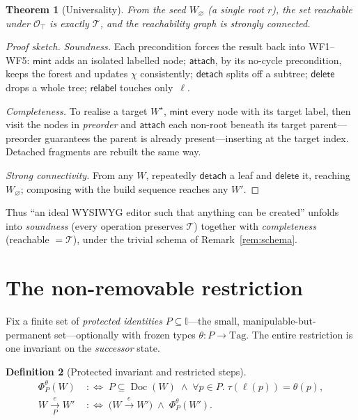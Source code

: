 \documentclass[11pt]{article}
\DeclareMathOperator{\Doc}{Doc}
\newcommand{\II}{\mathbb{I}}                 %
\newcommand{\Tree}{\mathcal{T}}              %
\newcommand{\Ops}{\mathcal{O}}
\newcommand{\coloniff}{\mathrel{:\Longleftrightarrow}}
\newcommand{\mint}{\mathsf{mint}}
\newcommand{\attach}{\mathsf{attach}}
\newcommand{\detach}{\mathsf{detach}}
\newcommand{\delete}{\mathsf{delete}}
\newcommand{\relabel}{\mathsf{relabel}}
\newcommand{\Wempty}{W_{\varnothing}}
\newcommand{\step}[1]{\xrightarrow{\,#1\,}}
\newcommand{\stepP}[1]{\xrightarrow[P]{\,#1\,}}
\theoremstyle{definition}
\newtheorem{definition}{Definition}[section]
\theoremstyle{plain}
\newtheorem{theorem}[definition]{Theorem}
\begin{document}
\begin{theorem}[Universality]\label{thm:univ}
From the seed $\Wempty$ (a single root $r$), the set reachable under
$\Ops_{\top}$ is exactly $\Tree$, and the reachability graph is strongly
connected.
\end{theorem}

\begin{proof}[Proof sketch]
\emph{Soundness.} Each precondition forces the result back into WF1--WF5: $\mint$
adds an isolated labelled node; $\attach$, by its no-cycle precondition, keeps
the forest and updates $\chi$ consistently; $\detach$ splits off a subtree;
$\delete$ drops a whole tree; $\relabel$ touches only~$\ell$.

\emph{Completeness.} To realise a target $W^\star$, $\mint$ every node with its
target label, then visit the nodes in \emph{preorder} and $\attach$ each
non-root beneath its target parent---preorder guarantees the parent is already
present---inserting at the target index. Detached fragments are rebuilt the same
way.

\emph{Strong connectivity.} From any $W$, repeatedly $\detach$ a leaf and
$\delete$ it, reaching $\Wempty$; composing with the build sequence reaches any
$W'$.
\end{proof}

Thus ``an ideal WYSIWYG editor such that anything can be created'' unfolds into
\emph{soundness} (every operation preserves $\Tree$) together with
\emph{completeness} (reachable $=\Tree$), under the trivial schema of
Remark~\ref{rem:schema}.

\section{The non-removable restriction}\label{sec:restricted}
Fix a finite set of \emph{protected identities} $P\subseteq\II$---the small,
manipulable-but-permanent set---optionally with frozen types
$\theta\colon P\to\mathrm{Tag}$. The entire restriction is one invariant on the
\emph{successor} state.

\begin{definition}[Protected invariant and restricted steps]\label{def:phi}
\begin{align*}
  \Phi^{\theta}_{P}(W)\;&\coloniff\;
     P\subseteq\Doc(W)\;\wedge\;\forall p\in P.\;\tau(\ell(p))=\theta(p),\\[2pt]
  W\stepP{e}W'\;&\coloniff\;\bigl(W\step{e}W'\bigr)\;\wedge\;\Phi^{\theta}_{P}(W').
\end{align*}
\end{definition}
\end{document}
